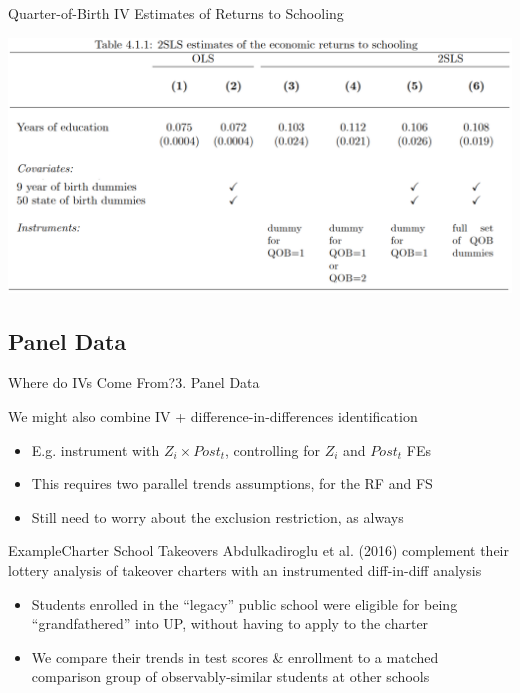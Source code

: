 \documentclass{beamer}
\begin{document}
\begin{frame}{Quarter-of-Birth IV Estimates of Returns to Schooling}

\begin{center}
\includegraphics[scale=0.32]{./lecture_includes/qob2.png}
\end{center}

\end{frame}

\subsection{Panel Data}
\begin{frame}{Where do IVs Come From?}{3. Panel Data}

We might also combine IV + difference-in-differences identification
\begin{itemize}
  \item E.g. instrument with $Z_i\times Post_t$, controlling for $Z_i$ and $Post_t$ FEs

  \item This requires two parallel trends assumptions, for the RF and FS

  \item Still need to worry about the exclusion restriction, as always
\end{itemize}
\end{frame}

\begin{frame}{Example}{Charter School Takeovers}
Abdulkadiroglu et al. (2016) complement their lottery analysis of takeover charters with an instrumented diff-in-diff analysis
\begin{itemize}
  \item Students enrolled in the ``legacy'' public school were eligible for being ``grandfathered'' into UP, without having to apply to the charter

  \item We compare their trends in test scores \& enrollment to a matched comparison group of observably-similar students at other schools
\end{itemize}
\end{frame}
\end{document}

